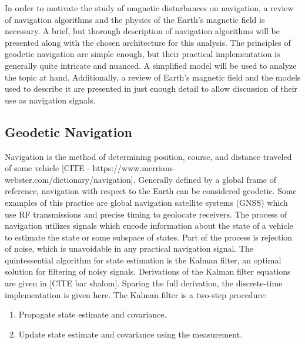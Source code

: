 \documentclass[conf]{new-aiaa}
\begin{document}
In order to motivate the study of magnetic disturbances on navigation, a review of navigation algorithms and the physics of the Earth's magnetic field is necessary. A brief, but thorough description of navigation algorithms will be presented along with the chosen architecture for this analysis. The principles of geodetic navigation are simple enough, but their practical implementation is generally quite intricate and nuanced. A simplified model will be used to analyze the topic at hand. Additionally, a review of Earth's magnetic field and the models used to describe it are presented in just enough detail to allow discussion of their use as navigation signals.

\subsection{Geodetic Navigation} %

Navigation is the method of determining position, course, and distance traveled of some vehicle [CITE - https://www.merriam-webster.com/dictionary/navigation]. Generally defined by a global frame of reference, navigation with respect to the Earth can be considered geodetic. Some examples of this practice are global navigation satellite systems (GNSS) which use RF transmissions and precise timing to geolocate receivers. The process of navigation utilizes signals which encode information about the state of a vehicle to estimate the state or some subspace of states. Part of the process is rejection of noise, which is unavoidable in any practical navigation signal. The quintessential algorithm for state estimation is the Kalman filter, an optimal solution for filtering of noisy signals. Derivations of the Kalman filter equations are given in [CITE bar shalom]. Sparing the full derivation, the discrete-time implementation is given here. The Kalman filter is a two-step procedure:\\

\begin{enumerate}
    \item Propagate state estimate and covariance.
    \item Update state estimate and covariance using the measurement.
\end{enumerate}
\end{document}
